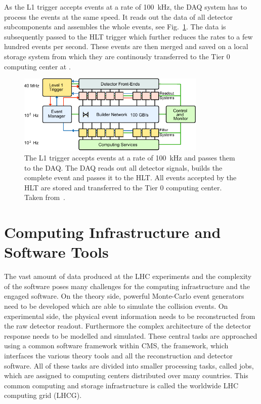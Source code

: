 As the L1 trigger accepts events at a rate of \SI{100}{\kilo\hertz}, the DAQ
system has to process the events at the same speed. It reads out the data of all
detector subcomponents and assembles the whole events, see
Fig.~\ref{fig:cms:daq_system}. The data is subsequently passed to the HLT
trigger which further reduces the rates to a few hundred events per second.
These events are then merged and saved on a local storage system from which they
are continously transferred to the Tier 0 computing center at \CERN.

\begin{figure}[h!tp]
    \centering
    \includegraphics[width=0.8\textwidth]{figures/cms_detector/cms_daq_new.pdf}\hfill
    \caption[The DAQ System of CMS]{The L1 trigger accepts events at a rate of
        \SI{100}{\kilo\hertz} and passes them to the DAQ. The DAQ reads out
        all detector signals, builds the complete event and passes it to the
        HLT. All events accepted by the HLT are stored and transferred to the
        Tier 0 computing center. Taken from~\cite{Bayatian:922757}.}
    \label{fig:cms:daq_system}
\end{figure}

\section{Computing Infrastructure and Software Tools}

The vast amount of data produced at the LHC experiments and the complexity of
the software poses many challenges for the computing infrastructure and the
engaged software. On the theory side, powerful Monte-Carlo event generators need
to be developed which are able to simulate the collision events. On experimental
side, the physical event information needs to be reconstructed from the raw
detector readout. Furthermore the complex architecture of the detector response
needs to be modelled and simulated. These central tasks are approached using a
common software framework within CMS, the \CMSSW framework, which interfaces the
various theory tools and all the reconstruction and detector software. All of
these tasks are divided into smaller processing tasks, called jobs, which are
assigned to computing centers distributed over many countries. This common
computing and storage infrastructure is called the worldwide LHC computing grid
(LHCG).

